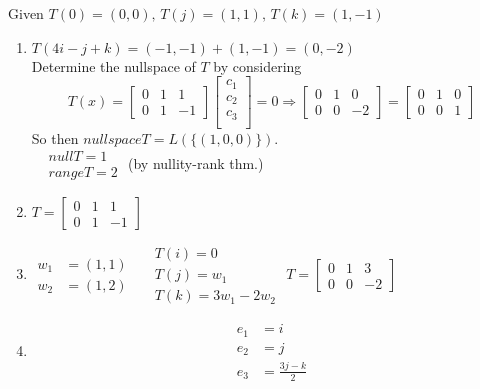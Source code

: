 \documentclass[twoside]{amsart}
\theoremstyle{plain}
\theoremstyle{definition}
\newcommand{\exercisehead}[1]
  {
   \noindent{\small\bf Exercise #1.}
   \smallskip}
\begin{document}
\exercisehead{7} Given $T(0)  = (0,0), \, T(j) = (1,1), \, T(k) = (1,-1)$
\begin{enumerate}
\item $T(4i - j + k ) = (-1,-1) + (1,-1) = (0,-2)$ \\
Determine the nullspace of $T$ by considering 
\[
T(x) = \left[ \begin{matrix} 0 & 1 & 1 \\
  0 & 1 & -1 \end{matrix} \right]\left[ \begin{matrix} c_1 \\ c_2 \\ c_3 \\ \end{matrix} \right] = 0 \Longrightarrow \left[ \begin{matrix} 0 & 1 & 0 \\
    0 & 0 & -2 \end{matrix} \right] = \left[ \begin{matrix} 0 & 1 & 0 \\ 0 & 0 & 1 \end{matrix} \right]
\]
So then $nullspace{T} = L(\{ (1,0,0) \} )$.  \\
$\begin{aligned}
  & null{T} = 1 \\
  & range{T} = 2 
\end{aligned}$ \quad \quad (by nullity-rank thm.)
\item $T = \left[ \begin{matrix} 0 & 1 & 1 \\
  0 & 1 & -1 \end{matrix} \right]$
\item $\begin{aligned}
  w_1 & = (1,1) \\
  w_2 & = (1,2)
\end{aligned}$ \quad \quad $\begin{aligned}
  & T(i) = 0 \\
  & T(j) = w_1 \\
  & T(k) = 3w_1 - 2w_2
\end{aligned}$ \quad \quad $T = \left[ \begin{matrix} 0 & 1 & 3 \\
0 & 0 & -2 \end{matrix} \right]$
\item 
\[
\boxed{ \begin{aligned}
    e_1 & = i \\
    e_2 & = j \\
    e_3 & = \frac{ 3j - k }{2}
\end{aligned} }
\]
\end{enumerate}
\end{document}
